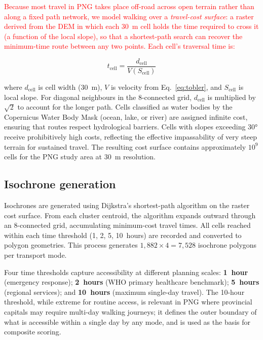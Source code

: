 \documentclass[review,3p,authoryear]{elsarticle}
\newcommand{\rev}[1]{\textcolor{red}{#1}}
\begin{document}
\rev{Because most travel in PNG takes place off-road across open terrain rather than along a fixed path network, we model walking over a \emph{travel-cost surface}: a raster derived from the DEM in which each \SI{30}{\metre} cell holds the time required to cross it (a function of the local slope), so that a shortest-path search can recover the minimum-time route between any two points. Each cell's traversal time is:}

\begin{equation}
t_{\text{cell}} = \frac{d_{\text{cell}}}{V(S_{\text{cell}})}
\label{eq:cost}
\end{equation}

\noindent where $d_{\text{cell}}$ is cell width (\SI{30}{\metre}), $V$ is velocity from Eq.~\eqref{eq:tobler}, and $S_{\text{cell}}$ is local slope. For diagonal neighbours in the 8-connected grid, $d_{\text{cell}}$ is multiplied by $\sqrt{2}$ to account for the longer path. Cells classified as water bodies by the Copernicus Water Body Mask (ocean, lake, or river) are assigned infinite cost, ensuring that routes respect hydrological barriers. Cells with slopes exceeding \ang{30} receive prohibitively high costs, reflecting the effective impassability of very steep terrain for sustained travel. The resulting cost surface contains approximately $10^{9}$ cells for the PNG study area at \SI{30}{\metre} resolution.

\subsection{Isochrone generation}

Isochrones are generated using Dijkstra's shortest-path algorithm \citep{dijkstra1959} on the raster cost surface. From each cluster centroid, the algorithm expands outward through an 8-connected grid, accumulating minimum-cost travel times. All cells reached within each time threshold (1, 2, 5, 10~hours) are recorded and converted to polygon geometries. This process generates $1{,}882 \times 4 = 7{,}528$ isochrone polygons per transport mode.

Four time thresholds capture accessibility at different planning scales: \textbf{1~hour} (emergency response); \textbf{2~hours} (WHO primary healthcare benchmark); \textbf{5~hours} (regional services); and \textbf{10~hours} (maximum single-day travel). The 10-hour threshold, while extreme for routine access, is relevant in PNG where provincial capitals may require multi-day walking journeys; it defines the outer boundary of what is accessible within a single day by any mode, and is used as the basis for composite scoring.
\end{document}
